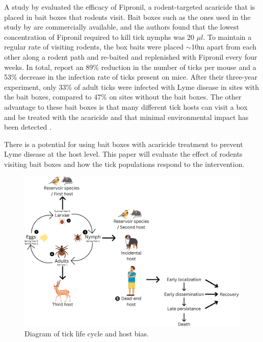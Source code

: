 \documentclass[12pt, centerh1]{article}
\begin{document}
A study by \citet{dolan2004control} evaluated the efficacy of Fipronil, a rodent-targeted acaricide that is placed in bait boxes that rodents visit. Bait boxes such as the ones used in the study by \citet{dolan2004control} are commercially available, and the authors found that the lowest concentration of Fipronil required to kill tick nymphs was 20 $\mu l$. To maintain a regular rate of visiting rodents, the box baits were placed $\sim$10m apart from each other along a rodent path and re-baited and replenished with Fipronil every four weeks. In total, \citet{dolan2004control} report an 89\% reduction in the number of ticks per mouse and a 53\% decrease in the infection rate of ticks present on mice. After their three-year experiment, only 33\% of adult ticks were infected with Lyme disease in sites with the bait boxes, compared to 47\% on sites without the bait boxes. The other advantage to these bait boxes is that many different tick hosts can visit a box and be treated with the acaricide and that minimal environmental impact has been detected \citep{dolan2004control}. 

There is a potential for using bait boxes with acaricide treatment to prevent Lyme disease at the host level. This paper will evaluate the effect of rodents visiting bait boxes and how the tick populations respond to the intervention.



\begin{figure}[h]
    \centering
    \includegraphics[scale = 0.15]{figures/Tick life cycle and progression of Lyme disease.png}
    \caption{Diagram of tick life cycle and host bias.}
    \label{fig:lifecycle}
\end{figure}
\end{document}
